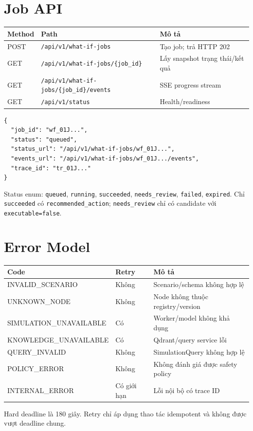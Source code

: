 \section{Job API}

\begin{longtable}{p{2cm} p{6cm} p{6cm}}
\toprule
\textbf{Method} & \textbf{Path} & \textbf{Mô tả} \\
\midrule
POST & \texttt{/api/v1/what-if-jobs} & Tạo job; trả HTTP 202 \\
GET & \texttt{/api/v1/what-if-jobs/\{job\_id\}} & Lấy snapshot trạng thái/kết quả \\
GET & \texttt{/api/v1/what-if-jobs/\{job\_id\}/events} & SSE progress stream \\
GET & \texttt{/api/v1/status} & Health/readiness \\
\bottomrule
\end{longtable}

\begin{lstlisting}[caption={Create-job response},label={lst:api_create}]
{
  "job_id": "wf_01J...",
  "status": "queued",
  "status_url": "/api/v1/what-if-jobs/wf_01J...",
  "events_url": "/api/v1/what-if-jobs/wf_01J.../events",
  "trace_id": "tr_01J..."
}
\end{lstlisting}

Status enum: \texttt{queued}, \texttt{running}, \texttt{succeeded}, \texttt{needs\_review}, \texttt{failed}, \texttt{expired}. Chỉ \texttt{succeeded} có \texttt{recommended\_action}; \texttt{needs\_review} chỉ có candidate với \texttt{executable=false}.

\section{Error Model}

\begin{longtable}{p{4cm} p{2cm} p{8cm}}
\toprule
\textbf{Code} & \textbf{Retry} & \textbf{Mô tả} \\
\midrule
INVALID\_SCENARIO & Không & Scenario/schema không hợp lệ \\
UNKNOWN\_NODE & Không & Node không thuộc registry/version \\
SIMULATION\_UNAVAILABLE & Có & Worker/model không khả dụng \\
KNOWLEDGE\_UNAVAILABLE & Có & Qdrant/query service lỗi \\
QUERY\_INVALID & Không & SimulationQuery không hợp lệ \\
POLICY\_ERROR & Không & Không đánh giá được safety policy \\
INTERNAL\_ERROR & Có giới hạn & Lỗi nội bộ có trace ID \\
\bottomrule
\end{longtable}

Hard deadline là 180 giây. Retry chỉ áp dụng thao tác idempotent và không được vượt deadline chung.
